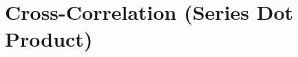\documentclass[12pt,letterpaper,twoside,fleqn]{book}
\title{\titlestring}
\author{\authorstring}
\date{\today}
\begin{document}
%
%
%
%
\newpage
\setcounter{page}{1}
%
%

  

\section{Cross-Correlation (Series Dot Product)}
 




%
\end{document}
